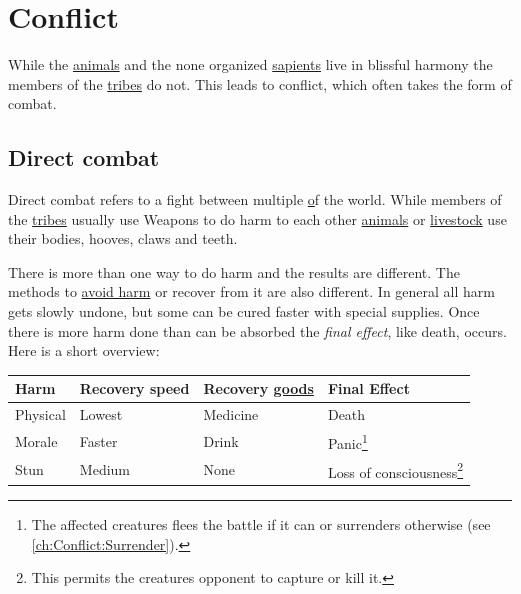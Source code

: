 \chapter{Conflict}\label{ch:Conflict}

While the \hyperref[ch:World:Inhabitants:Animals]{animals} and the none
organized \hyperref[ch:World:Inhabitants:Sapients]{sapients} live in blissful
harmony the members of the \hyperref[ch:Tribes]{tribes} do not. This leads to
conflict, which often takes the form of combat.

\section{Direct combat}\label{ch:Conflict:Combat}

Direct combat refers to a fight between multiple
\hyperref[ch:World:Inhabitants] of the world. While members of the
\hyperref[ch:Tribes]{tribes} usually use \glspl{Weapon} to do harm to each
other \hyperref[ch:World:Inhabitants:Animals]{animals} or
\hyperref[ch:World:Inhabitants:Livestock]{livestock} use their bodies, hooves,
claws and teeth.

There is more than one way to do harm and the results are different. The
methods to \hyperref[ch:Goods:Armory:Armor]{avoid harm} or recover from it are
also different. In general all harm gets slowly undone, but some can be cured
faster with special supplies. Once there is more harm done than can be absorbed
the \emph{final effect}, like death, occurs. Here is a short overview:

\begin{longtable}{llll}
	\toprule
	Harm     & Recovery speed & Recovery \hyperref[ch:Goods]{goods} & Final Effect                                                                                                                     \\
	\midrule
	Physical & Lowest         & \Gls{Medicine}                      & Death                                                                                                                            \\
	Morale   & Faster         & \Gls{Drink}                         & Panic\footnote{The affected creatures flees the battle if it can or surrenders otherwise (see \autoref{ch:Conflict:Surrender}).} \\
	Stun     & Medium         & None                                & Loss of consciousness\footnote{This permits the creatures opponent to capture or kill it.}                                       \\
	\bottomrule
\end{longtable}

